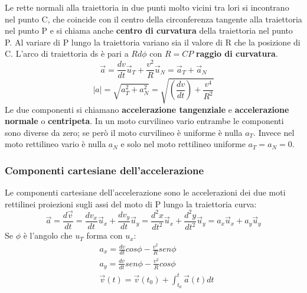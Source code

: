 \documentclass{article}
\numberwithin{equation}{subsection}
\begin{document}
\begin{minipage}[t]{0.55\textwidth}
  \raggedright
Le rette normali alla traiettoria in due punti molto vicini tra lori si incontrano nel punto C, che coincide con il centro della circonferenza tangente alla traiettoria nel punto P e si chiama anche \textbf{centro di curvatura} della traiettoria nel punto P. Al variare di P lungo la traiettoria variano sia il valore di R che la posizione di C. L'arco di traiettoria ds è pari a $Rd\phi$ con $R=CP$ \textbf{raggio di curvatura}.
\begin{equation}
    \vec{a}=\frac{dv}{dt}\vec{u}_T + \frac{v^2}{R}\vec{u}_N=\vec{a}_T+\vec{a}_N
\end{equation}
\begin{equation}
    |a|=\sqrt{a_T^2+a_N^2}=\sqrt{(\frac{dv}{dt})+\frac{v^4}{R^2}}
\end{equation}
Le due componenti si chiamano \textbf{accelerazione tangenziale} e \textbf{accelerazione normale} o \textbf{centripeta}. In un moto curvilineo vario entrambe le componenti sono diverse da zero; se però il moto curvilineo è uniforme è nulla $a_T$. Invece nel moto rettilineo vario è nulla $a_N$ e solo nel moto rettilineo uniforme $a_T=a_N=0$.
  \end{minipage}
  \subsubsection{Componenti cartesiane dell'accelerazione}
  Le componenti cartesiane dell'accelerazione sono le accelerazioni dei due moti rettilinei proiezioni sugli assi del moto di P lungo la traiettoria curva:
  \begin{equation}
      \vec{a}=\frac{d\vec{v}}{dt}=\frac{dv_x}{dt}\vec{u}_x+\frac{dv_y}{dt}\vec{u}_y=\frac{d^2x}{dt^2}\vec{u}_x + \frac{d^2y}{dt^2}\vec{u}_y=a_x\vec{u}_x+a_y\vec{u}_y
  \end{equation}
  Se $\phi$ è l'angolo che $u_T$ forma con $u_x$:
  \begin{align}
     & a_x=\frac{dv}{dt}cos\phi-\frac{v^2}{R}sen\phi \\
     & a_y=\frac{dv}{dt}sen\phi-\frac{v^2}{R}cos\phi \\
     & \vec{v}(t) = \vec{v}(t_0) + \int_{t_0}^t \vec{a}(t)dt
  \end{align}
\end{document}
